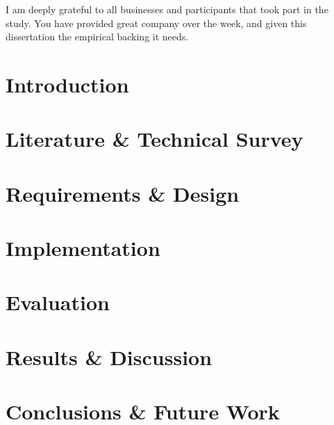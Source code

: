 \documentclass[11pt,openright,a4paper]{report}
\begin{document}
I am deeply grateful to all businesses and participants that took part in
the study. You have provided great company over the week, and given this
dissertation the empirical backing it needs.

\newpage


\setcounter{page}{1}



\chapter{Introduction}


\chapter{Literature \& Technical Survey}


\chapter{Requirements \& Design}



\chapter{Implementation}


\chapter{Evaluation}


\chapter{Results \& Discussion}


\chapter{Conclusions \& Future Work}






\appendix

\end{document}
